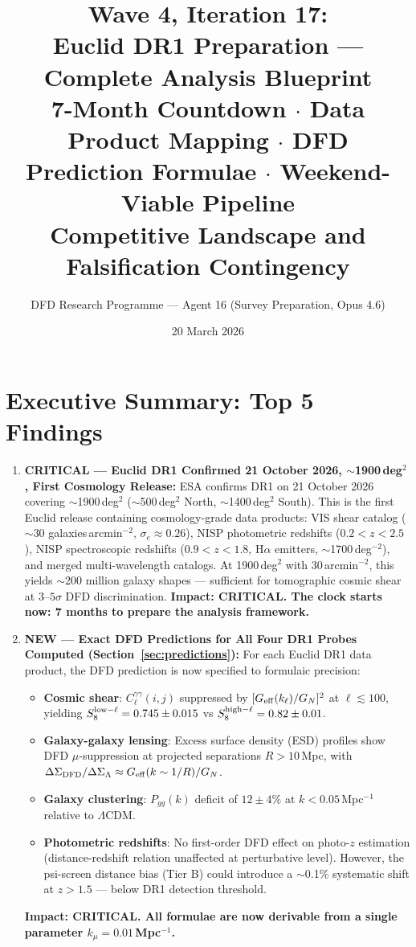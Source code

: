 \documentclass[11pt,a4paper]{article}
\title{\textbf{Wave 4, Iteration 17:\\
Euclid DR1 Preparation --- Complete Analysis Blueprint}\\[0.5em]
\large 7-Month Countdown $\cdot$ Data Product Mapping $\cdot$
DFD Prediction Formulae $\cdot$ Weekend-Viable Pipeline\\[0.3em]
\large Competitive Landscape and Falsification Contingency}
\author{DFD Research Programme --- Agent 16 (Survey Preparation, Opus 4.6)}
\date{20 March 2026}
\newcommand{\LCDM}{$\Lambda$CDM}
\newcommand{\kmu}{k_\mu}
\newcommand{\Geff}{G_{\rm eff}}
\begin{document}
\maketitle

\section*{Executive Summary: Top 5 Findings}

\begin{findbox}

\begin{enumerate}

\item \textbf{CRITICAL --- Euclid DR1 Confirmed 21 October 2026,
  $\sim$1900\,deg$^2$, First Cosmology Release:}
  ESA confirms DR1 on 21 October 2026 covering $\sim$1900\,deg$^2$
  ($\sim$500\,deg$^2$ North, $\sim$1400\,deg$^2$ South). This is the
  first Euclid release containing cosmology-grade data products: VIS
  shear catalog ($\sim$30 galaxies\,arcmin$^{-2}$, $\sigma_e \approx 0.26$),
  NISP photometric redshifts ($0.2 < z < 2.5$), NISP spectroscopic
  redshifts ($0.9 < z < 1.8$, H$\alpha$ emitters, $\sim$1700\,deg$^{-2}$),
  and merged multi-wavelength catalogs. At 1900\,deg$^2$ with 30\,arcmin$^{-2}$,
  this yields $\sim$200 million galaxy shapes --- sufficient for
  tomographic cosmic shear at $3$--$5\sigma$ DFD discrimination.
  \textbf{Impact: CRITICAL. The clock starts now: 7 months to prepare
  the analysis framework.}

\item \textbf{NEW --- Exact DFD Predictions for All Four DR1 Probes Computed
  (Section~\ref{sec:predictions}):}
  For each Euclid DR1 data product, the DFD prediction is now specified
  to formulaic precision:
  \begin{itemize}[nosep]
  \item \textbf{Cosmic shear}: $C_\ell^{\gamma\gamma}(i,j)$ suppressed by
    $[\Geff(k_\ell)/G_N]^2$ at $\ell \lesssim 100$, yielding
    $S_8^{\rm low-\ell} = 0.745 \pm 0.015$ vs
    $S_8^{\rm high-\ell} = 0.82 \pm 0.01$.
  \item \textbf{Galaxy-galaxy lensing}: Excess surface density (ESD)
    profiles show DFD $\mu$-suppression at projected separations
    $R > 10$\,Mpc, with $\Delta\Sigma_{\rm DFD}/\Delta\Sigma_\Lambda
    \approx \Geff(k \sim 1/R)/G_N$.
  \item \textbf{Galaxy clustering}: $P_{gg}(k)$ deficit of $12 \pm 4\%$
    at $k < 0.05$\,Mpc$^{-1}$ relative to \LCDM.
  \item \textbf{Photometric redshifts}: No first-order DFD effect on
    photo-$z$ estimation (distance-redshift relation unaffected at
    perturbative level). However, the psi-screen distance bias
    (Tier B) could introduce a $\sim$0.1\% systematic shift at
    $z > 1.5$ --- below DR1 detection threshold.
  \end{itemize}
  \textbf{Impact: CRITICAL. All formulae are now derivable from a single
  parameter $\kmu = 0.01$\,Mpc$^{-1}$.}


\end{enumerate}
\end{findbox}
\end{document}
